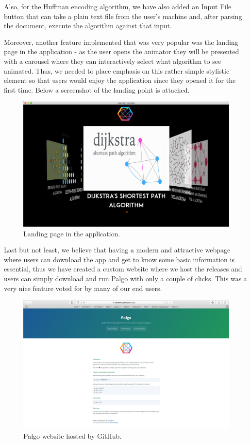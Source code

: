 \documentclass{l4proj}
\begin{document}
Also, for the Huffman encoding algorithm, we have also added an Input File button that can take a plain text file from
the user's machine and, after parsing the document, execute the algorithm against that input. 

Moreover, another feature implemented that was very popular was the landing page in the application - as
the user opens the animator they will be presented with a carousel where they can interactively select what algorithm
to see animated. Thus, we needed to place emphasis on this rather simple stylistic element so that users would enjoy
the application since they opened it for the first time. Below a screenshot of the landing point is attached.

\begin{figure}[!ht]
    \centering
    \includegraphics[scale=0.3]{landing-page}
    \caption{Landing page in the application.}
    \label{fig:landing-page}
\end{figure}

\pagebreak

Last but not least, we believe that having a modern and attractive webpage where users can download the app and get to
know some basic information is essential, thus we have created a custom website where we host the releases and users can simply
download and run Palgo with only a couple of clicks. This was a very nice feature voted for by many of our end users.

\begin{figure}[!ht]
    \centering
    \includegraphics[scale=0.3]{palgo-website}
    \caption{Palgo website hosted by GitHub.}
    \label{fig:palgo-website}
\end{figure}
\end{document}
